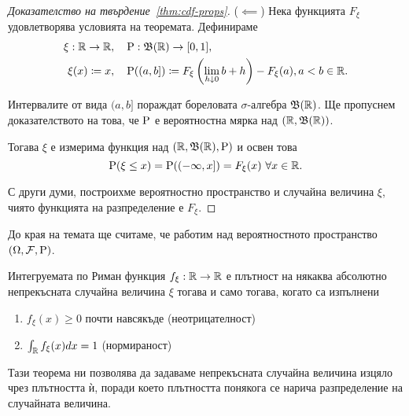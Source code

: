 \documentclass[numbers=endperiod, DIV=15, bibliography=totocnumbered]{scrartcl}
\begin{document}
\begin{proof}[Доказателство на твърдение~\ref{thm:cdf-props}]
  ($\impliedby$) Нека функцията $F_\xi$ удовлетворява условията на теоремата. Дефинираме
  \begin{align*}
    \xi: \mathbb{R} \to \mathbb{R},     &&& \operatorname{P}: \mathfrak{B}(\mathbb{R}) \to [0, 1], \\
    \xi(x) \coloneqq x, &&& \operatorname{P}((a, b]) \coloneqq F_\xi \left(\lim_{h \downarrow 0} b + h \right) - F_\xi(a), a < b \in \mathbb{R}.
  \end{align*}

  Интервалите от вида $(a, b]$ пораждат бореловата $\sigma$-алгебра $\mathfrak{B}(\mathbb{R})$. Ще пропуснем доказателството на това, че $\operatorname{P}$ е вероятностна мярка над $(\mathbb{R}, \mathfrak{B}(\mathbb{R}))$.

  Тогава $\xi$ е измерима функция над $(\mathbb{R}, \mathfrak{B}(\mathbb{R}), \operatorname{P})$ и освен това
  \begin{displaymath}
    \operatorname{P}(\xi \leq x)
    =
    \operatorname{P}((-\infty, x])
    =
    F_\xi(x)~\forall x \in \mathbb{R}.
  \end{displaymath}

  С други думи, построихме вероятностно пространство и случайна величина $\xi$, чиято функцията на разпределение е $F_\xi$.
\end{proof}

До края на темата ще считаме, че работим над вероятностното пространство $(\Omega, \mathcal{F}, \operatorname{P})$.

\begin{theorem}\label{thm:density-props}
  Интегруемата по Риман функция $f_\xi: \mathbb{R} \to \mathbb{R}$ е плътност на някаква абсолютно непрекъсната случайна величина $\xi$ тогава и само тогава, когато са изпълнени
  \begin{enumerate}
    \item $f_\xi(x) \geq 0$ почти навсякъде (неотрицателност)
    \item $\int_{\mathbb{R}} f_\xi(x) dx = 1$ (нормираност)
  \end{enumerate}
\end{theorem}

Тази теорема ни позволява да задаваме непрекъсната случайна величина изцяло чрез плътността ѝ, поради което плътността понякога се нарича разпределение на случайната величина.
\end{document}

